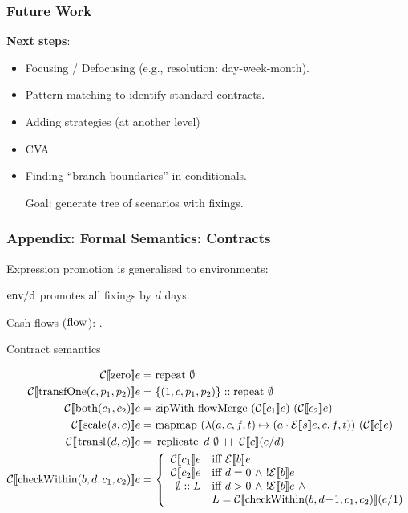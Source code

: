 \documentclass[xcolor=dvipsnames,11pt]{beamer}
\renewcommand{\emph}[1]{\textcolor{structure!90}{#1}}
\newcommand{\ttt}[1]{\mbox{\cd{#1}}}
\newcommand{\zero}{\ttt{zero}}
\newcommand{\transfOne}{\ttt{transfOne}}
\newcommand{\scale}{\ttt{scale}}
\newcommand{\transl}{\ttt{transl}}
\newcommand{\both}{\ttt{both}}
\newcommand{\checkWithin}{\ttt{checkWithin}}
\begin{document}
\begin{frame}
\frametitle{Future Work}

\textbf{Next steps}:
\begin{itemize}
  \item Focusing / Defocusing  (e.g., resolution: day-week-month).
  \item Pattern matching to identify standard contracts.
  \item Adding strategies (at another level)
  \item CVA
  \item Finding ``branch-boundaries'' in conditionals.

      \emph{Goal:} generate tree of scenarios with fixings.
\end{itemize}
\end{frame}

\begin{frame}
    \frametitle{Appendix: Formal Semantics: Contracts}

Expression promotion is generalised to environments: 
{\footnotesize
\begin{center}
$\ttt{env/d}$ promotes all fixings by $d$ days.
\end{center}}

Cash flows ($\ttt{flow}$): .

\vfill

Contract semantics \hfill \framebox{$ \mathcal{C} : \ttt{contr} \times \ttt{env} 
          \rightarrow \mathbb{P}(\ttt{flow})^\mathbb{N}$}

\vspace{-2ex}
{\footnotesize
\begin{align*}
\csem{\zero}{e}{\ttt{repeat}\ \emptyset}\\
\csem{\transfOne(c,p_1,p_2)}{e}{\{(1,c,p_1,p_2)\} :: \ttt{repeat}\ \emptyset }\\
\csem{\both(c_1,c_2)}{e}{\ttt{zipWith flowMerge }\ (\mathcal{C}\sem{c_1}e)\ (\mathcal{C}\sem{c_2}e)}\\
\csem{\scale(s,c)}{e}{\ttt{mapmap}\ (\lambda (a,c,f,t)\mapsto(a\cdot\mathcal{E}\sem{s}e,c,f,t))\ (\mathcal{C}\sem{c}e)}\\
\csem{\transl(d,c)}{e}{\ttt{replicate}\ d \ \emptyset +\!\!\!+\  \mathcal{C}\sem{c}(e/d)}\\
\csem{\checkWithin(b,d,c_1,c_2)}{e}{
\left \{
\begin{array}{rl}
\mathcal{C}\sem{c_1}e & \mbox{iff}\ \mathcal{E}\sem{b}e \\
\mathcal{C}\sem{c_2}e & \mbox{iff}\ d = 0\ \wedge\ !\mathcal{E}\sem{b}e  \\
\emptyset :: L & \mbox{iff}\ d > 0\ \wedge\ !\mathcal{E}\sem{b}e \ \wedge \\
& L = \mathcal{C}\sem{\checkWithin(b,d\!-\!1,c_1,c_2)}(e/1)
\end{array}\right.
}
\end{align*}
}

\end{frame}
\end{document}
